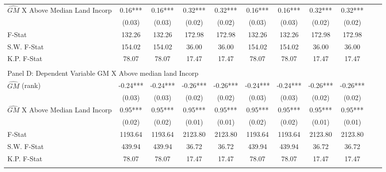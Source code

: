 \begin{table}[htbp]
\begin{threeparttable}
\begin{tabular}{l*{10}{c}}
\addlinespace
$\hat{GM}$ X Above Median Land Incorp&       0.16***&       0.16***&       0.32***&       0.32***&       0.16***&       0.16***&       0.32***&       0.32***\\
                &     (0.03)   &     (0.03)   &     (0.02)   &     (0.02)   &     (0.03)   &     (0.03)   &     (0.02)   &     (0.02)   \\
\midrule
F-Stat          &     132.26   &     132.26   &     172.98   &     172.98   &     132.26   &     132.26   &     172.98   &     172.98   \\
S.W. F-Stat     &     154.02   &     154.02   &      36.00   &      36.00   &     154.02   &     154.02   &      36.00   &      36.00   \\
K.P. F-Stat     &      78.07   &      78.07   &      17.47   &      17.47   &      78.07   &      78.07   &      17.47   &      17.47   \\
\cmidrule[\heavyrulewidth](lr){1-9} \\ \cmidrule[\heavyrulewidth](lr){1-9}
\multicolumn{8}{l}{Panel D: Dependent Variable GM X Above median land Incorp}\\
\cmidrule(lr){1-9}
$\hat{GM}$ (rank)&      -0.24***&      -0.24***&      -0.26***&      -0.26***&      -0.24***&      -0.24***&      -0.26***&      -0.26***\\
                &     (0.03)   &     (0.03)   &     (0.02)   &     (0.02)   &     (0.03)   &     (0.03)   &     (0.02)   &     (0.02)   \\
\addlinespace
$\hat{GM}$ X Above Median Land Incorp&       0.95***&       0.95***&       0.95***&       0.95***&       0.95***&       0.95***&       0.95***&       0.95***\\
                &     (0.02)   &     (0.02)   &     (0.01)   &     (0.01)   &     (0.02)   &     (0.02)   &     (0.01)   &     (0.01)   \\
\midrule
F-Stat          &    1193.64   &    1193.64   &    2123.80   &    2123.80   &    1193.64   &    1193.64   &    2123.80   &    2123.80   \\
S.W. F-Stat     &     439.94   &     439.94   &      36.72   &      36.72   &     439.94   &     439.94   &      36.72   &      36.72   \\
K.P. F-Stat     &      78.07   &      78.07   &      17.47   &      17.47   &      78.07   &      78.07   &      17.47   &      17.47   \\
\cmidrule[\heavyrulewidth](lr){1-9} \\ \cmidrule[\heavyrulewidth](lr){1-9}

\end{tabular}
\end{threeparttable}
\end{table}
